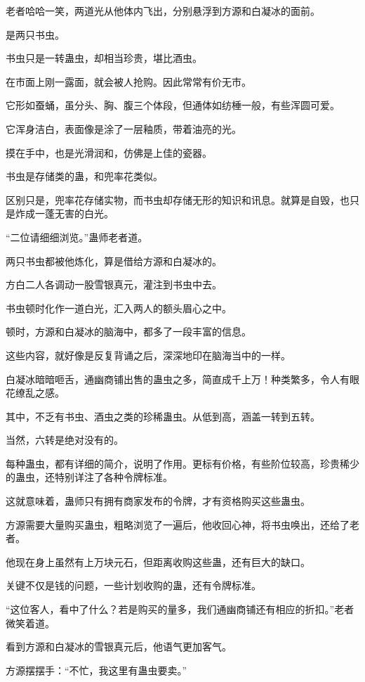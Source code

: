 \begin{this_body}
老者哈哈一笑，两道光从他体内飞出，分别悬浮到方源和白凝冰的面前。

是两只书虫。

书虫只是一转蛊虫，却相当珍贵，堪比酒虫。

在市面上刚一露面，就会被人抢购。因此常常有价无市。

它形如蚕蛹，虽分头、胸、腹三个体段，但通体如纺棰一般，有些浑圆可爱。

它浑身洁白，表面像是涂了一层釉质，带着油亮的光。

摸在手中，也是光滑润和，仿佛是上佳的瓷器。

书虫是存储类的蛊，和兜率花类似。

区别只是，兜率花存储实物，而书虫却存储无形的知识和讯息。就算是自毁，也只是炸成一蓬无害的白光。

“二位请细细浏览。”蛊师老者道。

两只书虫都被他炼化，算是借给方源和白凝冰的。

方白二人各调动一股雪银真元，灌注到书虫中去。

书虫顿时化作一道白光，汇入两人的额头眉心之中。

顿时，方源和白凝冰的脑海中，都多了一段丰富的信息。

这些内容，就好像是反复背诵之后，深深地印在脑海当中的一样。

白凝冰暗暗咂舌，通幽商铺出售的蛊虫之多，简直成千上万！种类繁多，令人有眼花缭乱之感。

其中，不乏有书虫、酒虫之类的珍稀蛊虫。从低到高，涵盖一转到五转。

当然，六转是绝对没有的。

每种蛊虫，都有详细的简介，说明了作用。更标有价格，有些阶位较高，珍贵稀少的蛊虫，还特别详注了各种令牌标准。

这就意味着，蛊师只有拥有商家发布的令牌，才有资格购买这些蛊虫。

方源需要大量购买蛊虫，粗略浏览了一遍后，他收回心神，将书虫唤出，还给了老者。

他现在身上虽然有上万块元石，但距离收购这些蛊，还有巨大的缺口。

关键不仅是钱的问题，一些计划收购的蛊，还有令牌标准。

“这位客人，看中了什么？若是购买的量多，我们通幽商铺还有相应的折扣。”老者微笑着道。

看到方源和白凝冰的雪银真元后，他语气更加客气。

方源摆摆手：“不忙，我这里有蛊虫要卖。”


\end{this_body}
